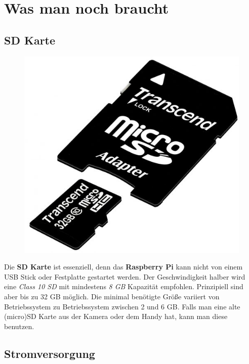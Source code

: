 \documentclass[12pt,a4paper]{article}
\newcommand{\rp}{\textbf{Raspberry Pi}\xspace}
\begin{document}
\section{Was man noch braucht}
\label{sec:acc}

\subsection{SD Karte}

\begin{figure}
  \vspace{-25pt}
  \begin{center}
    \includegraphics[scale=0.2]{sd_card}
  \end{center}
  \vspace{-25pt}
\end{figure}

Die \textbf{SD Karte} ist essenziell, denn das \rp kann nicht von einem USB Stick oder Festplatte gestartet werden. Der Geschwindigkeit halber wird eine \textit{Class 10 SD} mit mindestens \textit{8 GB} Kapazität empfohlen. Prinzipiell sind aber bis zu 32 GB möglich. Die minimal benötigte Größe variiert von Betriebssystem zu Betriebssystem zwischen 2 und 6 GB. Falls man eine alte (micro)SD Karte aus der Kamera oder dem Handy hat, kann man diese benutzen.

\subsection{Stromversorgung}
\end{document}

